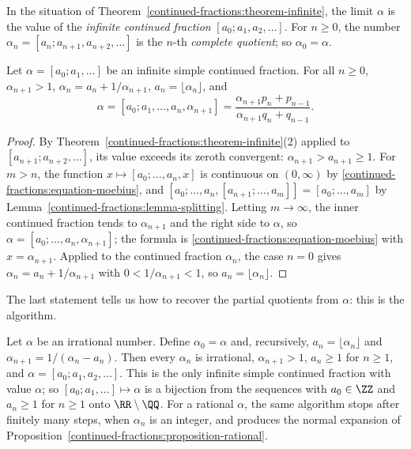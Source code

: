 \begin{definition}\label{continued-fractions:definition-infinite}
In the situation of Theorem~\ref{continued-fractions:theorem-infinite}, the limit $\alpha$ is the value of the \emph{infinite continued fraction} $[a_0; a_1, a_2, \ldots]$. For $n \geq 0$, the number
$\alpha_n = [a_n; a_{n+1}, a_{n+2}, \ldots]$ is the $n$-th \emph{complete quotient}; so $\alpha_0 = \alpha$.
\end{definition}

\begin{proposition}\label{continued-fractions:proposition-complete-quotients}
Let $\alpha = [a_0; a_1, \ldots]$ be an infinite simple continued fraction. For all $n \geq 0$, $\alpha_{n+1} > 1$, $\alpha_n = a_n + 1/\alpha_{n+1}$, $a_n = \lfloor \alpha_n \rfloor$, and
\[
\alpha = [a_0; a_1, \ldots, a_n, \alpha_{n+1}] = \frac{\alpha_{n+1}p_n + p_{n-1}}{\alpha_{n+1}q_n + q_{n-1}}.
\]
\end{proposition}

\begin{proof}
By Theorem~\ref{continued-fractions:theorem-infinite}(2) applied to $[a_{n+1}; a_{n+2}, \ldots]$, its value exceeds its zeroth convergent: $\alpha_{n+1} > a_{n+1} \geq 1$. For $m > n$, the
function $x \mapsto [a_0; \ldots, a_n, x]$ is continuous on $(0, \infty)$ by \eqref{continued-fractions:equation-moebius}, and $[a_0; \ldots, a_n, [a_{n+1}; \ldots, a_m]] = [a_0; \ldots, a_m]$ by
Lemma~\ref{continued-fractions:lemma-splitting}. Letting $m \to \infty$, the inner continued fraction tends to $\alpha_{n+1}$ and the right side to $\alpha$, so
$\alpha = [a_0; \ldots, a_n, \alpha_{n+1}]$; the formula is \eqref{continued-fractions:equation-moebius} with $x = \alpha_{n+1}$. Applied to the continued fraction $\alpha_n$, the case $n = 0$ gives
$\alpha_n = a_n + 1/\alpha_{n+1}$ with $0 < 1/\alpha_{n+1} < 1$, so $a_n = \lfloor \alpha_n \rfloor$.
\end{proof}

The last statement tells us how to recover the partial quotients from $\alpha$: this is the algorithm.

\begin{theorem}\label{continued-fractions:theorem-expansion}
Let $\alpha$ be an irrational number. Define $\alpha_0 = \alpha$ and, recursively, $a_n = \lfloor \alpha_n \rfloor$ and $\alpha_{n+1} = 1/(\alpha_n - a_n)$. Then every $\alpha_n$ is irrational,
$\alpha_{n+1} > 1$, $a_n \geq 1$ for $n \geq 1$, and $\alpha = [a_0; a_1, a_2, \ldots]$. This is the only infinite simple continued fraction with value $\alpha$; so
$[a_0; a_1, \ldots] \mapsto \alpha$ is a bijection from the sequences with $a_0 \in \ZZ$ and $a_n \geq 1$ for $n \geq 1$ onto $\RR \setminus \QQ$. For a rational $\alpha$, the same algorithm stops
after finitely many steps, when $\alpha_n$ is an integer, and produces the normal expansion of Proposition~\ref{continued-fractions:proposition-rational}.
\end{theorem}

